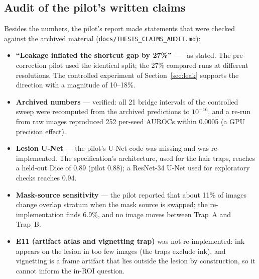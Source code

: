 \subsection{Audit of the pilot's written claims}
Besides the numbers, the pilot's report made statements that were checked against the archived material
(\texttt{docs/THESIS\_CLAIMS\_AUDIT.md}):
\begin{itemize}[leftmargin=*]\itemsep1pt
\item \textbf{``Leakage inflated the shortcut gap by 27\%''} --- \no\ as stated. The pre-correction pilot used the
identical split; the 27\% compared runs at different resolutions. The controlled experiment of
Section~\ref{sec:leak} supports the direction with a magnitude of 10--18\%.
\item \textbf{Archived numbers} --- verified: all 21 bridge intervals of the controlled sweep were recomputed from the
archived predictions to $10^{-16}$, and a re-run from raw images reproduced 252 per-seed AUROCs within 0.0005 (a GPU
precision effect).
\item \textbf{Lesion U-Net} --- the pilot's U-Net code was missing and was re-implemented. The specification's
architecture, used for the hair traps, reaches a held-out Dice of 0.89 (pilot 0.88); a ResNet-34 U-Net used for
exploratory checks reaches 0.94.
\item \textbf{Mask-source sensitivity} --- the pilot reported that about 11\% of images change overlap stratum when the
mask source is swapped; the re-implementation finds 6.9\%, and no image moves between Trap~A and Trap~B.
\item \textbf{E11 (artifact atlas and vignetting trap)} was not re-implemented: ink appears on the lesion in too few
images (the traps exclude ink), and vignetting is a frame artifact that lies outside the lesion by construction, so it
cannot inform the in-ROI question.
\end{itemize}

